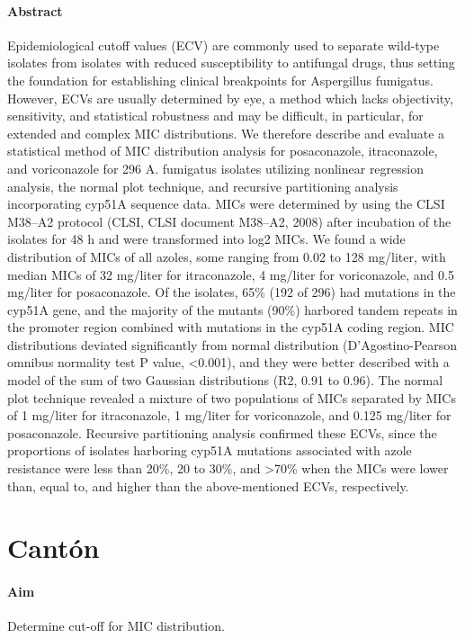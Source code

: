 \documentclass[a4paper]{article}
\begin{document}
\paragraph{Abstract} Epidemiological cutoff values (ECV) are commonly used to separate wild-type isolates from isolates with reduced susceptibility to antifungal drugs, thus setting the foundation for establishing clinical breakpoints for Aspergillus fumigatus. However, ECVs are usually determined by eye, a method which lacks objectivity, sensitivity, and statistical robustness and may be difficult, in particular, for extended and complex MIC distributions. We therefore describe and evaluate a statistical method of MIC distribution analysis for posaconazole, itraconazole, and voriconazole for 296 A. fumigatus isolates utilizing nonlinear regression analysis, the normal plot technique, and recursive partitioning analysis incorporating cyp51A sequence data. MICs were determined by using the CLSI M38–A2 protocol (CLSI, CLSI document M38–A2, 2008) after incubation of the isolates for 48 h and were transformed into log2 MICs. We found a wide distribution of MICs of all azoles, some ranging from 0.02 to 128 mg/liter, with median MICs of 32 mg/liter for itraconazole, 4 mg/liter for voriconazole, and 0.5 mg/liter for posaconazole. Of the isolates, 65\% (192 of 296) had mutations in the cyp51A gene, and the majority of the mutants (90\%) harbored tandem repeats in the promoter region combined with mutations in the cyp51A coding region. MIC distributions deviated significantly from normal distribution (D'Agostino-Pearson omnibus normality test P value, <0.001), and they were better described with a model of the sum of two Gaussian distributions (R2, 0.91 to 0.96). The normal plot technique revealed a mixture of two populations of MICs separated by MICs of 1 mg/liter for itraconazole, 1 mg/liter for voriconazole, and 0.125 mg/liter for posaconazole. Recursive partitioning analysis confirmed these ECVs, since the proportions of isolates harboring cyp51A mutations associated with azole resistance were less than 20\%, 20 to 30\%, and >70\% when the MICs were lower than, equal to, and higher than the above-mentioned ECVs, respectively.



\section{Cant{\'o}n \cite{Canton2012}}
\paragraph{Aim} Determine cut-off for MIC distribution.
\end{document}
